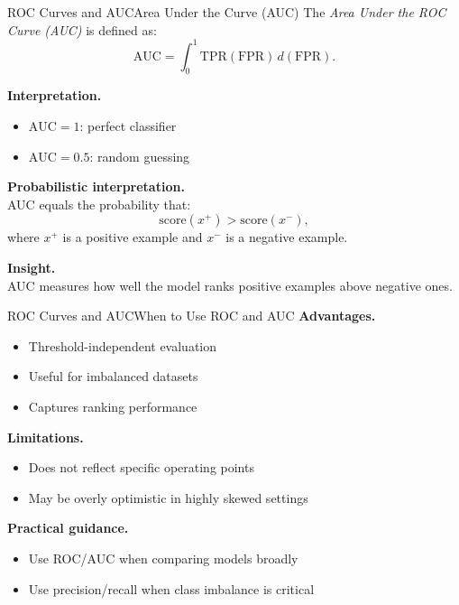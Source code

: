 \documentclass[aspectratio=169,11pt]{beamer}
\begin{document}
\begin{frame}[t,allowframebreaks]{ROC Curves and AUC}{Area Under the Curve (AUC)}
\small
The \emph{Area Under the ROC Curve (AUC)} is defined as:
\[
\text{AUC} = \int_0^1 \text{TPR}(\text{FPR}) \, d(\text{FPR}).
\]

\textbf{Interpretation.}\\ \begin{itemize}
    \item $\text{AUC} = 1$: perfect classifier
    \item $\text{AUC} = 0.5$: random guessing
\end{itemize}

\textbf{Probabilistic interpretation.}\\ AUC equals the probability that:
\[
\text{score}(x^+) > \text{score}(x^-),
\]
where $x^+$ is a positive example and $x^-$ is a negative example.

\textbf{Insight.}\\ AUC measures how well the model ranks positive examples above negative ones.
\end{frame}

\begin{frame}[t,allowframebreaks]{ROC Curves and AUC}{When to Use ROC and AUC}
\small
\textbf{Advantages.}\\ \begin{itemize}
    \item Threshold-independent evaluation
    \item Useful for imbalanced datasets
    \item Captures ranking performance
\end{itemize}

\textbf{Limitations.}\\ \begin{itemize}
    \item Does not reflect specific operating points
    \item May be overly optimistic in highly skewed settings
\end{itemize}

\textbf{Practical guidance.}\\ \begin{itemize}
    \item Use ROC/AUC when comparing models broadly
    \item Use precision/recall when class imbalance is critical
\end{itemize}
\end{frame}
\end{document}
